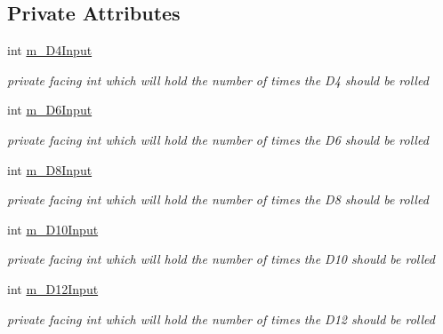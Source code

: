 \subsection*{Private Attributes}
\begin{DoxyCompactItemize}
\item 
int \mbox{\hyperlink{class_dungeons__n___dragons___manager_1_1_viewmodels_1_1_dice_roll_tab_viewmodel_a8a99863e2d907731393dcb92fa3a5dc0}{m\+\_\+\+D4\+Input}}
\begin{DoxyCompactList}\small\item\em private facing int which will hold the number of times the D4 should be rolled \end{DoxyCompactList}\item 
int \mbox{\hyperlink{class_dungeons__n___dragons___manager_1_1_viewmodels_1_1_dice_roll_tab_viewmodel_a31fa0704573195979396a70c07f958ff}{m\+\_\+\+D6\+Input}}
\begin{DoxyCompactList}\small\item\em private facing int which will hold the number of times the D6 should be rolled \end{DoxyCompactList}\item 
int \mbox{\hyperlink{class_dungeons__n___dragons___manager_1_1_viewmodels_1_1_dice_roll_tab_viewmodel_a1c7ce0ee115fe70df046d6cce41de612}{m\+\_\+\+D8\+Input}}
\begin{DoxyCompactList}\small\item\em private facing int which will hold the number of times the D8 should be rolled \end{DoxyCompactList}\item 
int \mbox{\hyperlink{class_dungeons__n___dragons___manager_1_1_viewmodels_1_1_dice_roll_tab_viewmodel_a001693aa04e48542b8a33764619da3e3}{m\+\_\+\+D10\+Input}}
\begin{DoxyCompactList}\small\item\em private facing int which will hold the number of times the D10 should be rolled \end{DoxyCompactList}\item 
int \mbox{\hyperlink{class_dungeons__n___dragons___manager_1_1_viewmodels_1_1_dice_roll_tab_viewmodel_aabca81cbf185aafebed4397005334b4c}{m\+\_\+\+D12\+Input}}
\begin{DoxyCompactList}\small\item\em private facing int which will hold the number of times the D12 should be rolled \end{DoxyCompactList}\item 

\end{DoxyCompactItemize}
